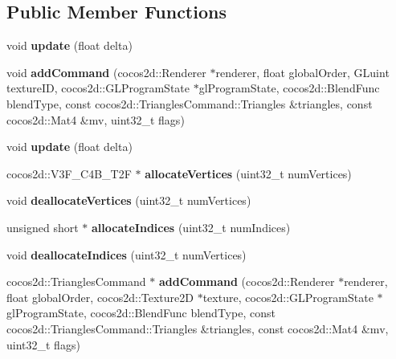 \subsection*{Public Member Functions}
\begin{DoxyCompactItemize}
\item 
\mbox{\label{classspine_1_1SkeletonBatch_aeba3e995baf654542dd08813fb366528}} 
void {\bfseries update} (float delta)
\item 
\mbox{\label{classspine_1_1SkeletonBatch_aee7a4586ad740710dbd633164ad44803}} 
void {\bfseries add\+Command} (cocos2d\+::\+Renderer $\ast$renderer, float global\+Order, G\+Luint texture\+ID, cocos2d\+::\+G\+L\+Program\+State $\ast$gl\+Program\+State, cocos2d\+::\+Blend\+Func blend\+Type, const cocos2d\+::\+Triangles\+Command\+::\+Triangles \&triangles, const cocos2d\+::\+Mat4 \&mv, uint32\+\_\+t flags)
\item 
\mbox{\label{classspine_1_1SkeletonBatch_aeba3e995baf654542dd08813fb366528}} 
void {\bfseries update} (float delta)
\item 
\mbox{\label{classspine_1_1SkeletonBatch_ac8a9840436602d1c8bf7e8aa59ca092f}} 
cocos2d\+::\+V3\+F\+\_\+\+C4\+B\+\_\+\+T2F $\ast$ {\bfseries allocate\+Vertices} (uint32\+\_\+t num\+Vertices)
\item 
\mbox{\label{classspine_1_1SkeletonBatch_ae7f2300ee79a3aac2c33a4f56c9a851d}} 
void {\bfseries deallocate\+Vertices} (uint32\+\_\+t num\+Vertices)
\item 
\mbox{\label{classspine_1_1SkeletonBatch_a90f37236b011a0ad7b0a84a2997680e2}} 
unsigned short $\ast$ {\bfseries allocate\+Indices} (uint32\+\_\+t num\+Indices)
\item 
\mbox{\label{classspine_1_1SkeletonBatch_a8aec63468be7f5e84bfcb4e1742b5c2b}} 
void {\bfseries deallocate\+Indices} (uint32\+\_\+t num\+Vertices)
\item 
\mbox{\label{classspine_1_1SkeletonBatch_aec1373eedc6bc63f5dff94f3d1d08098}} 
cocos2d\+::\+Triangles\+Command $\ast$ {\bfseries add\+Command} (cocos2d\+::\+Renderer $\ast$renderer, float global\+Order, cocos2d\+::\+Texture2D $\ast$texture, cocos2d\+::\+G\+L\+Program\+State $\ast$gl\+Program\+State, cocos2d\+::\+Blend\+Func blend\+Type, const cocos2d\+::\+Triangles\+Command\+::\+Triangles \&triangles, const cocos2d\+::\+Mat4 \&mv, uint32\+\_\+t flags)
\end{DoxyCompactItemize}
